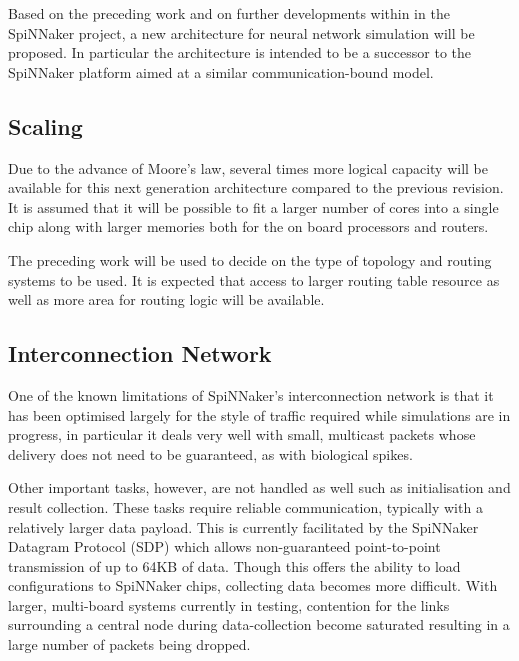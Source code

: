		
		Based on the preceding work and on further developments within in the
		SpiNNaker project, a new architecture for neural network simulation will be
		proposed. In particular the architecture is intended to be a successor to
		the SpiNNaker platform aimed at a similar communication-bound model.
		
		\subsection{Scaling}
			
			Due to the advance of Moore's law, several times more logical capacity
			will be available for this next generation architecture compared to the
			previous revision. It is assumed that it will be possible to fit a larger
			number of cores into a single chip along with larger memories both for the
			on board processors and routers.
			
			The preceding work will be used to decide on the type of topology and
			routing systems to be used. It is expected that access to larger routing
			table resource as well as more area for routing logic will be available.
		
		\subsection{Interconnection Network}
			
			One of the known limitations of SpiNNaker's interconnection network is
			that it has been optimised largely for the style of traffic required while
			simulations are in progress, in particular it deals very well with small,
			multicast packets whose delivery does not need to be guaranteed, as with
			biological spikes.
			
			Other important tasks, however, are not handled as well such as
			initialisation and result collection. These tasks require reliable
			communication, typically with a relatively larger data payload. This is
			currently facilitated by the SpiNNaker Datagram Protocol (SDP)
			\cite{temple11} which allows non-guaranteed point-to-point transmission of
			up to 64KB of data. Though this offers the ability to load configurations
			to SpiNNaker chips, collecting data becomes more difficult.  With larger,
			multi-board systems currently in testing, contention for the links
			surrounding a central node during data-collection become saturated
			resulting in a large number of packets being dropped.
		
